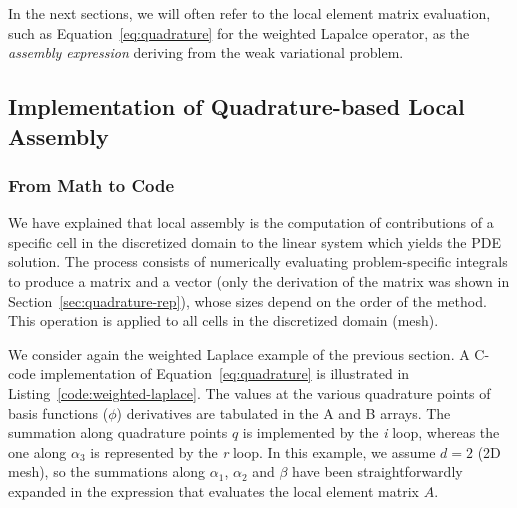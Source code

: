 In the next sections, we will often refer to the local element matrix evaluation, such as Equation~\ref{eq:quadrature} for the weighted Lapalce operator, as the \textit{assembly expression} deriving from the weak variational problem.

\subsection{Implementation of Quadrature-based Local Assembly}
\subsubsection{From Math to Code}
We have explained that local assembly is the computation of contributions of a specific cell in the discretized domain to the linear system which yields the PDE solution. The process consists of numerically evaluating problem-specific integrals to produce a matrix and a vector (only the derivation of the matrix was shown in Section~\ref{sec:quadrature-rep}), whose sizes depend on the order of the method. This operation is applied to all cells in the discretized domain (mesh).

We consider again the weighted Laplace example of the previous section. A C-code implementation of Equation~\ref{eq:quadrature} is illustrated in Listing~\ref{code:weighted-laplace}. The values at the various quadrature points of basis functions ($\phi$) derivatives are tabulated in the A and B arrays. The summation along quadrature points $q$ is implemented by the \emph{i} loop, whereas the one along $\alpha_3$ is represented by the \emph{r} loop. In this example, we assume $d=2$ (2D mesh), so the summations along $\alpha_1$, $\alpha_2$ and $\beta$ have been straightforwardly expanded in the expression that evaluates the local element matrix $A$. 

